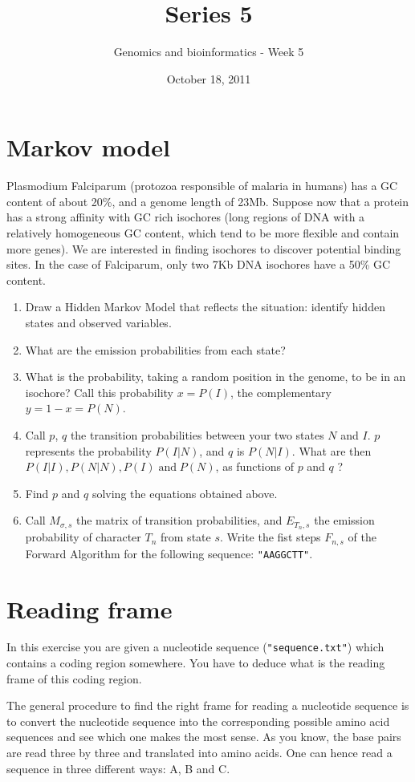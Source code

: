 \documentclass[a4paper,11pt]{article}
\title{Series 5}
\date{October 18, 2011}
\author{Genomics and bioinformatics - Week 5}
\begin{document}
\maketitle

\section{Markov model}
Plasmodium Falciparum (protozoa responsible of malaria in humans) has a GC content of about 20\%, and a genome length of 23Mb. Suppose now that a protein has a strong affinity with GC rich isochores (long regions of DNA with a relatively homogeneous GC content, which tend to be more flexible and contain more genes). We are interested in finding isochores to discover potential binding sites. In the case of Falciparum, only two 7Kb DNA isochores have a 50\% GC content. 
\begin{enumerate}
\item Draw a Hidden Markov Model that reflects the situation: identify hidden states and observed variables.
\item What are the emission probabilities from each state?
\item What is the probability, taking a random position in the genome, to be in an isochore? Call this probability $x = P(I)$, the complementary $y = 1-x = P(N)$.
\item Call $p$, $q$ the transition probabilities between your two states $N$ and $I$. $p$ represents the probability $P(I|N)$, and $q$ is $P(N|I)$. What are then $P(I|I), P(N|N), P(I) \;\text{and}\; P(N)$, as functions of $p$ and $q$ ?
\item Find $p$ and $q$ solving the equations obtained above.
\item Call $M_{\sigma,s}$ the matrix of transition probabilities, and $E_{T_n,s}$ the emission probability of character $T_n$ from state $s$. Write the fist steps $F_{n,s}$ of the Forward Algorithm for the following sequence: \texttt{"AAGGCTT"}.
\end{enumerate}

\section{Reading frame}
In this exercise you are given a nucleotide sequence (\texttt{"sequence.txt"}) which contains a coding region somewhere. You have to deduce what is the reading frame of this coding region.

The general procedure to find the right frame for reading a nucleotide sequence is to convert the nucleotide sequence into the corresponding possible amino acid sequences and see which one makes the most sense. As you know, the base pairs are read three by three and translated into amino acids. One can hence read a sequence in three different ways: A, B and C.
\end{document}
